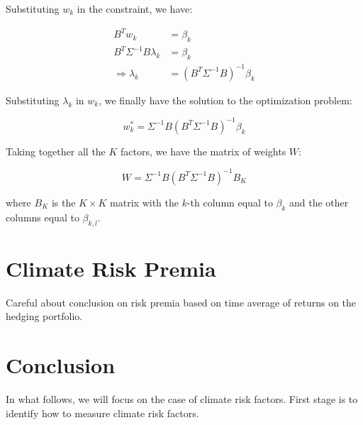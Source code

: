 Substituting $w_k$ in the constraint, we have:

\begin{equation}
    \begin{aligned}
        B^T w_k &= \beta_k \\
        B^T \Sigma^{-1} B \lambda_k &= \beta_k \\
        \Rightarrow \lambda_k &= (B^T \Sigma^{-1} B)^{-1} \beta_k
    \end{aligned}
\end{equation}

Substituting $\lambda_k$ in $w_k$, we finally have 
the solution to the optimization problem:

\begin{equation}
    w_k^* = \Sigma^{-1} B (B^T \Sigma^{-1} B)^{-1} \beta_k
\end{equation}

Taking together all the $K$ factors, we have the matrix of weights $W$:

\begin{equation}
    W = \Sigma^{-1} B (B^T \Sigma^{-1} B)^{-1} B_K
\end{equation}

where $B_K$ is the $K \times K$ matrix with the $k$-th column equal to $\beta_k$ and the other columns equal to $\beta_{k,l}$.

\section{Climate Risk Premia}

Careful about conclusion on risk premia based 
on time average of returns on the hedging portfolio.

\section{Conclusion}

In what follows, we will focus 
on the case of climate risk factors.
First stage is to identify how to measure 
climate risk factors.
